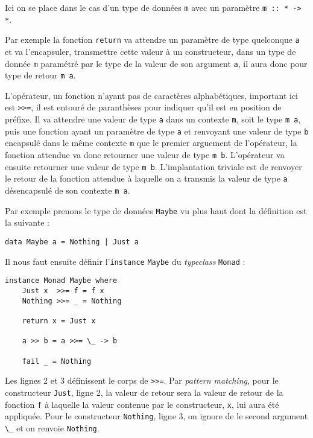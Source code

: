 \documentclass{llncs}
\begin{document}
Ici on se place dans le cas d'un type de données \lstinline{m} avec un paramètre
\lstinline{m :: * -> *}.

Par exemple la fonction \lstinline{return} va attendre un paramètre de type quelconque
\lstinline{a} et va l'encapsuler, transmettre cette valeur à un constructeur, dans
un type de donnée \lstinline{m} paramétré par le type de la valeur de son argument
\lstinline{a}, il aura donc pour type de retour \lstinline{m a}.

L'opérateur, un fonction n'ayant pas de caractères alphabétiques, important ici
est \lstinline{>>=}, il est entouré de paranthèses pour indiquer qu'il est en
position de préfixe.
Il va attendre une valeur de type \lstinline{a} dans un contexte \lstinline{m}, soit
le type \lstinline{m a}, puis une fonction ayant un paramètre de type \lstinline{a}
et renvoyant une valeur de type \lstinline{b} encapsulé dans le même contexte \lstinline{m}
que le premier arguement de l'opérateur, la fonction attendue va donc retourner
une valeur de type \lstinline{m b}. L'opérateur va ensuite retourner une valeur de
type \lstinline{m b}.
L'implantation triviale est de renvoyer le retour de la fonction attendue à
laquelle on a transmis la valeur de type \lstinline{a} désencapsulé de son contexte
\lstinline{m a}.

Par exemple prenons le type de données \lstinline{Maybe} vu plus haut dont la définition
est la suivante :
\begin{lstlisting}
data Maybe a = Nothing | Just a
\end{lstlisting}

Il nous faut ensuite définir l'\lstinline{instance} \lstinline{Maybe} du \emph{typeclass}
\lstinline{Monad} :
\begin{lstlisting}
instance Monad Maybe where
    Just x  >>= f = f x
    Nothing >>= _ = Nothing

    return x = Just x

    a >> b = a >>= \_ -> b

    fail _ = Nothing
\end{lstlisting}

Les lignes 2 et 3 définissent le corps de \lstinline{>>=}.
Par \emph{pattern matching}, pour le constructeur \lstinline{Just}, ligne 2,
la valeur de retour sera la valeur de retour de la fonction \lstinline{f} à
laquelle la valeur contenue par le constructeur, \lstinline{x}, lui aura été appliquée.
Pour le constructeur \lstinline{Nothing}, ligne 3, on ignore de le second argument
\lstinline{\_} et on renvoie \lstinline{Nothing}.
\end{document}
